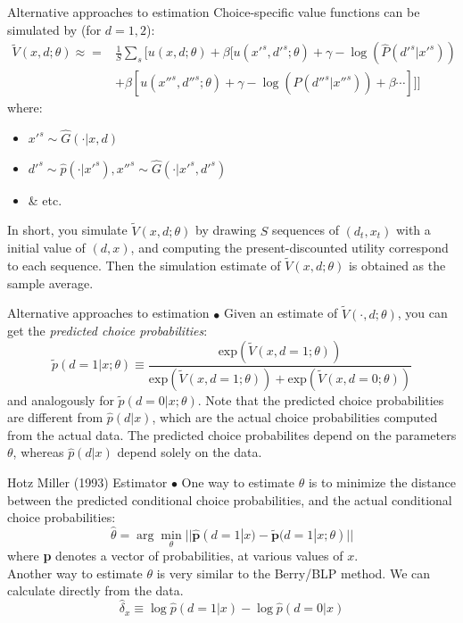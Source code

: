 \documentclass[aspectratio=169,11pt]{beamer}
\begin{document}
\begin{frame}{Alternative approaches to estimation}
Choice-specific value functions can be simulated by (for $d=1,2$): 
\begin{eqnarray*}
\tilde V (x, d; \theta) \approx = & \frac 1 S \sum_s [ u(x, d;\theta) + \beta [ u(x'^s, d'^s;\theta) + \gamma - \log(\hat P(d'^s|x'^s)) \\
& +\beta [ u(x''^s, d''^s;\theta) + \gamma - \log (\hat P (d''^s |x''^s)) + \beta \cdots ]]]
\end{eqnarray*}
where:
\begin{itemize}
\item $x'^s \sim \hat G(\cdot | x, d)$ 
\item $d'^s \sim \hat p(\cdot | x'^s), x''^s \sim \hat G(\cdot | x'^s, d'^s)$ 
\item \& etc. 
\end{itemize}
In short, you simulate $\tilde V (x, d;\theta)$ by drawing $S$ \alert{sequences} of $(d_t, x_t)$ with a initial value of $(d, x)$, and computing the present-discounted utility correspond to each sequence. Then the simulation estimate of $\tilde V (x, d;\theta)$ is obtained as the sample average. 
\end{frame}


\begin{frame}{Alternative approaches to estimation}
$\bullet$ Given an estimate of $\tilde V (\cdot, d; \theta)$, you can get the \emph{predicted choice probabilities}: 
\begin{equation}
\tilde p (d =1 |x ; \theta) \equiv \frac {\text{exp} \left ( \tilde V (x, d=1; \theta) \right )}{\text{exp} \left ( \tilde V (x, d=1 ;\theta) \right ) + \text{exp} \left ( \tilde V (x, d= 0 ;\theta ) \right )}
\end{equation}
and analogously for $\tilde p (d = 0 |x ; \theta)$. Note that the predicted choice probabilities are different from $\hat p (d|x)$, which are the actual choice probabilities computed from the actual data. The predicted choice probabilites depend on the parameters $\theta$, whereas $\hat p (d|x)$ depend solely on the data. 
\end{frame}

\begin{frame}{Hotz Miller (1993) Estimator}
$\bullet$ One way to estimate $\theta$ is to minimize the distance between the predicted conditional choice probabilities, and the actual conditional choice probabilities:
\begin{equation*}
\hat \theta = \arg \min_\theta || \hat {\symbf{p}} (d = 1 |x) - \tilde {\symbf{p}} (d = 1 |x; \theta) ||
\end{equation*}
where \textbf{p} denotes a vector of probabilities, at various values of $x$. \\
Another way to estimate $\theta$ is very similar to the Berry/BLP method. We can calculate directly from the data. 
\begin{equation*}
\hat \delta_x \equiv \log \hat p ( d =1 |x) - \log \hat p (d = 0 |x)
\end{equation*}
\end{frame}
\end{document}
